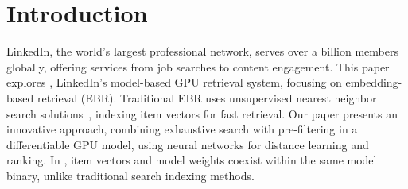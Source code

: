 \section{Introduction}\label{sec:intro}



LinkedIn, the world's largest professional network, serves over a billion members globally, offering services from job searches to content engagement. This paper explores {\systemname}, LinkedIn's model-based GPU retrieval system, focusing on embedding-based retrieval (EBR). Traditional EBR uses unsupervised nearest neighbor search solutions~\cite{hnsw_paper, pq_paper}, indexing item vectors for fast retrieval. Our paper presents an innovative approach, combining exhaustive search with pre-filtering in a differentiable GPU model, using neural networks for distance learning and ranking. In {\systemname}, item vectors and model weights coexist within the same model binary, unlike traditional search indexing methods.

